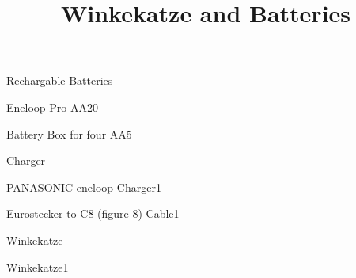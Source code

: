 \def\papersize{5}




\title{Winkekatze and Batteries}

\begin{checklist}{Rechargable Batteries}
  \item{Eneloop Pro AA}{20}
  \item{Battery Box for four AA}{5}
\end{checklist}

\begin{checklist}{Charger}
  \item{PANASONIC eneloop Charger}{1}
  \item{Eurostecker to C8 (figure 8) Cable}{1}
\end{checklist}

\begin{checklist}{Winkekatze}
  \item{Winkekatze}{1}
\end{checklist}


